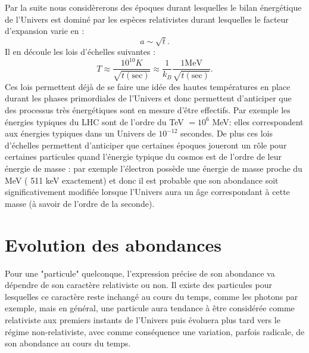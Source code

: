 Par la suite nous considèrerons des époques durant lesquelles le bilan énergétique de l'Univers est dominé par les espèces relativistes durant lesquelles le facteur d'expansion varie en :
\begin{equation}
a\sim \sqrt t.
\end{equation}
Il en découle les lois d'échelles suivantes :
\begin{equation}
T\approx\frac{10^{10} K}{\sqrt{t\mathrm{(sec)}}} \approx \frac{1}{k_B}\frac{1 \mathrm{MeV}}{\sqrt{t\mathrm{(sec)}}}.
\end{equation}
Ces lois permettent déjà de se faire une idée des hautes températures en place durant les phases primordiales de l'Univers et donc permettent d'anticiper que des processus très énergétiques sont en mesure d'être effectifs. Par exemple les énergies typiques du LHC sont de l'ordre du TeV $=10^6$ MeV: elles correspondent aux énergies typiques dans un Univers de $10^{-12}$ secondes. De plus ces lois d'échelles permettent d'anticiper que certaines époques joueront un rôle pour certaines particules quand l'énergie typique du cosmos est de l'ordre de leur énergie de masse : par exemple l'électron possède une énergie de masse proche du MeV ( 511 keV exactement) et donc il est probable que son abondance soit significativement modifiée lorsque l'Univers aura un âge correspondant à cette masse (à savoir de l'ordre de la seconde).


\section{Evolution des abondances}
Pour une "particule" quelconque, l'expression précise de son abondance va dépendre de son caractère relativiste ou non. Il existe des particules pour lesquelles ce caractère reste inchangé au cours du temps, comme les photons par exemple, mais en général, une particule aura tendance à être considérée comme relativiste aux premiers instants de l'Univers puis évoluera plus tard vers le régime non-relativiste, avec comme conséquence une variation, parfois radicale, de son abondance au cours du temps.

